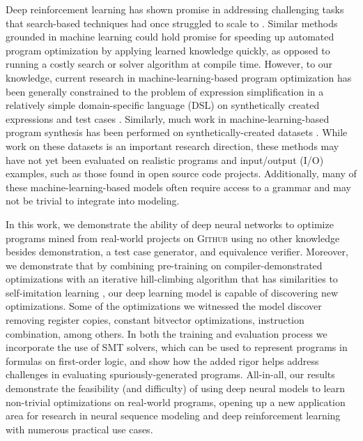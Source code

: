 \documentclass{article}
\begin{document}
Deep reinforcement learning has shown promise in addressing challenging tasks that search-based techniques had once struggled to scale to \cite{silver2017mastering}. Similar methods grounded in machine learning could hold promise for speeding up automated program optimization by applying learned knowledge quickly, as opposed to running a costly search or solver algorithm at compile time. However, to our knowledge, current research in machine-learning-based program optimization has been generally constrained to the problem of expression simplification in a relatively simple domain-specific language (DSL) on synthetically created expressions and test cases \cite{shi2020}. Similarly, much work in machine-learning-based program synthesis  has been performed on synthetically-created datasets \cite{parisotto2016neuro,bunel2018leveraging}. While work on these datasets is an important research direction, these methods may have not yet been evaluated on realistic programs and input/output (I/O) examples, such as those found in open source code projects. Additionally, many of these machine-learning-based models often require access to a grammar and may not be trivial to integrate into modeling.

In this work, we demonstrate the ability of deep neural networks to optimize programs mined from real-world projects on \textsc{Github} using no other knowledge besides demonstration, a test case generator, and equivalence verifier. 
Moreover, we demonstrate that by combining pre-training on compiler-demonstrated optimizations with an iterative hill-climbing algorithm that has similarities to self-imitation learning \cite{oh2018self}, our deep learning model is capable of discovering new optimizations. Some of the optimizations we witnessed the model discover removing register copies, constant bitvector optimizations, instruction combination, among others. In both the training and evaluation process we incorporate the use of SMT solvers, which can be used to represent programs in formulas on first-order logic, and show how the added rigor helps address challenges in evaluating spuriously-generated programs.
All-in-all, our results demonstrate the feasibility (and difficulty) of using deep neural models to learn non-trivial optimizations on real-world programs, opening up a new application area for research in neural sequence modeling and deep reinforcement learning with numerous practical use cases.
\end{document}
